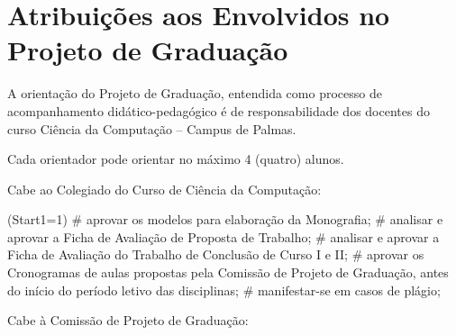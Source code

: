 \documentclass[12pt,geral,titlewithdate]{uftdocs}
\begin{document}
\chapter{Atribuições aos Envolvidos no Projeto de Graduação}

\artigo A orientação do Projeto de Graduação, entendida como processo de acompanhamento didático-pedagógico é de responsabilidade dos docentes do curso Ciência da Computação -- Campus de Palmas.

\artigo Cada orientador pode orientar no máximo 4 (quatro) alunos.

\artigo Cabe ao Colegiado do Curso de Ciência da Computação:

\begin{easylist}\ListProperties(Start1=1)
# aprovar os modelos para elaboração da Monografia;
# analisar e aprovar a Ficha de Avaliação de Proposta de Trabalho;
# analisar e aprovar a Ficha de Avaliação do Trabalho de Conclusão de Curso I e II;
# aprovar os Cronogramas de aulas propostas pela Comissão de Projeto de Graduação, antes do início do período letivo das disciplinas;
# manifestar-se em casos de plágio; 
\end{easylist}

\artigo Cabe à Comissão de Projeto de Graduação:
\end{document}

